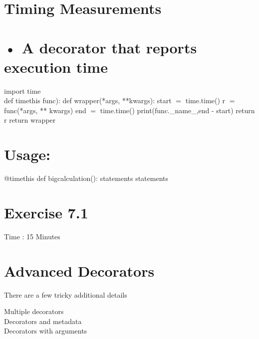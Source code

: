 \documentclass[
  letterpaper,
  DIV=11,
  numbers=noendperiod]{scrreprt}
\newenvironment{Shaded}{\begin{snugshade}}{\end{snugshade}}
\newcommand{\NormalTok}[1]{\textcolor[rgb]{0.00,0.23,0.31}{#1}}
\begin{document}

\chapter{Timing Measurements}\label{timing-measurements}


\chapter{• A decorator that reports execution
time}\label{a-decorator-that-reports-execution-time}

import time\\
def timethis func): def wrapper(*args, **kwargs): start \(=\)
time.time() r \(=\) func(*args, ** kwargs) end \(=\) time.time()
print(func.\_name\_,end - start) return r return wrapper


\chapter{Usage:}\label{usage-1}

\begin{Shaded}
\begin{Highlighting}[]
\NormalTok{@timethis  }
\NormalTok{def bigcalculation():  }
\NormalTok{    statements  }
\NormalTok{    statements }
\end{Highlighting}
\end{Shaded}


\chapter{Exercise 7.1}\label{exercise-7.1}

Time : 15 Minutes


\chapter{Advanced Decorators}\label{advanced-decorators}

There are a few tricky additional details

Multiple decorators\\
Decorators and metadata\\
Decorators with arguments
\end{document}
